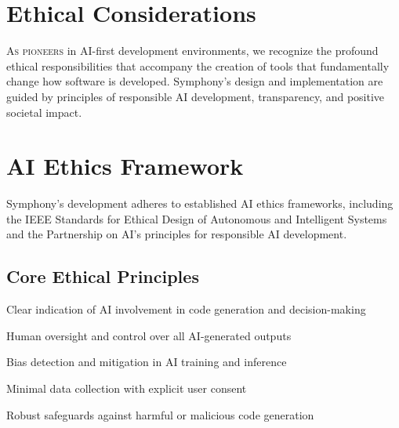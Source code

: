 
\section*{Ethical Considerations}

\lettrine{A}{s pioneers} in AI-first development environments, we recognize the profound ethical responsibilities that accompany the creation of tools that fundamentally change how software is developed. Symphony's design and implementation are guided by principles of responsible AI development, transparency, and positive societal impact.

\section*{AI Ethics Framework}

\begin{infobox}[title=Ethical AI Development Principles]
Symphony's development adheres to established AI ethics frameworks, including the IEEE Standards for Ethical Design of Autonomous and Intelligent Systems and the Partnership on AI's principles for responsible AI development.
\end{infobox}

\subsection*{Core Ethical Principles}

\begin{description}[leftmargin=3cm,labelwidth=2.5cm]
    \item[\textbf{Transparency}] Clear indication of AI involvement in code generation and decision-making
    \item[\textbf{Accountability}] Human oversight and control over all AI-generated outputs
    \item[\textbf{Fairness}] Bias detection and mitigation in AI training and inference
    \item[\textbf{Privacy}] Minimal data collection with explicit user consent
    \item[\textbf{Safety}] Robust safeguards against harmful or malicious code generation
\end{description}


